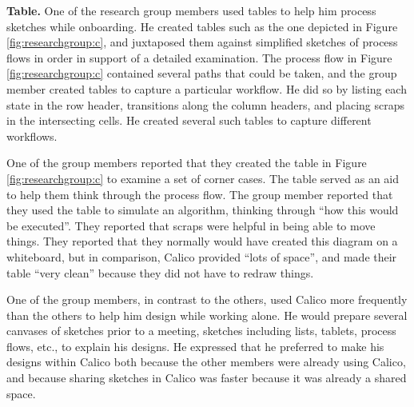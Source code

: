 

\textbf{Table.} One of the research group members used tables to help him process sketches while onboarding. He created tables such as the one depicted in Figure \ref{fig:researchgroup:c}, and juxtaposed them against simplified sketches of process flows in order in support of a detailed examination. The process flow in Figure \ref{fig:researchgroup:c} contained several paths that could be taken, and the group member created tables to capture a particular workflow. He did so by listing each state in the row header, transitions along the column headers, and placing scraps in the intersecting cells. He created several such tables to capture different workflows.

One of the group members reported that they created the table in Figure \ref{fig:researchgroup:c} to examine a set of corner cases. The table served as an aid to help them think through the process flow. The group member reported that they used the table to simulate an algorithm, thinking through ``how this would be executed''. They reported that scraps were helpful in being able to move things. They reported that they normally would have created this diagram on a whiteboard, but in comparison, Calico provided ``lots of space'', and made their table ``very clean'' because they did not have to redraw things. 


One of the group members, in contrast to the others, used Calico more frequently than the others to help him design while working alone. He would prepare several canvases of sketches prior to a meeting, sketches including lists, tablets, process flows, etc., to explain his designs. He expressed that he preferred to make his designs within Calico both because the other members were already using Calico, and because sharing sketches in Calico was faster because it was already a shared space.

%
%
%

